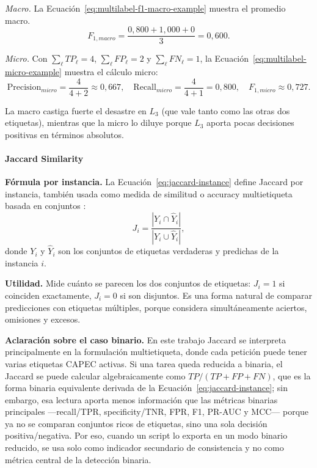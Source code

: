 \documentclass[12pt,oneside]{report}
\begin{document}
\emph{Macro.} La Ecuación~\eqref{eq:multilabel-f1-macro-example} muestra el promedio macro.
\begin{equation}
\label{eq:multilabel-f1-macro-example}
F_{1,macro}=\frac{0{,}800+1{,}000+0}{3}=0{,}600.
\end{equation}

\emph{Micro.} Con $\sum_\ell TP_\ell=4$, $\sum_\ell FP_\ell=2$ y
$\sum_\ell FN_\ell=1$, la Ecuación~\eqref{eq:multilabel-micro-example} muestra el cálculo micro:
\begin{equation}
\label{eq:multilabel-micro-example}
\mathrm{Precision}_{micro}=\frac{4}{4+2}\approx 0{,}667,\quad
\mathrm{Recall}_{micro}=\frac{4}{4+1}=0{,}800,\quad
F_{1,micro}\approx 0{,}727.
\end{equation}

La macro castiga fuerte el desastre en $L_3$ (que vale tanto como las
otras dos etiquetas), mientras que la micro lo diluye porque $L_3$
aporta pocas decisiones positivas en términos absolutos.

\paragraph{Jaccard Similarity}

\textbf{Fórmula por instancia.} La Ecuación~\eqref{eq:jaccard-instance} define Jaccard por instancia, también usada como medida de similitud o accuracy multietiqueta basada en conjuntos \cite{tsoumakas_multilabel_overview,read2011}:
\begin{equation}
\label{eq:jaccard-instance}
J_i = \frac{|Y_i \cap \hat{Y}_i|}{|Y_i \cup \hat{Y}_i|},
\end{equation}
donde $Y_i$ y $\hat{Y}_i$ son los conjuntos de etiquetas verdaderas y
predichas de la instancia $i$.

\textbf{Utilidad.} Mide cuánto se parecen los dos conjuntos de
etiquetas: $J_i=1$ si coinciden exactamente, $J_i=0$ si son disjuntos.
Es una forma natural de comparar predicciones con etiquetas múltiples,
porque considera simultáneamente aciertos, omisiones y excesos.

\textbf{Aclaración sobre el caso binario.} En este trabajo Jaccard se
interpreta principalmente en la formulación multietiqueta, donde cada
petición puede tener varias etiquetas CAPEC activas. Si una tarea queda
reducida a binaria, el Jaccard se puede calcular algebraicamente como
$TP/(TP+FP+FN)$, que es la forma binaria equivalente derivada de la Ecuación~\eqref{eq:jaccard-instance}; sin embargo, esa lectura aporta menos información que las
métricas binarias principales —recall/TPR, specificity/TNR, FPR, F1,
PR-AUC y MCC— porque ya no se comparan conjuntos ricos de etiquetas,
sino una sola decisión positiva/negativa. Por eso, cuando un script
lo exporta en un modo binario reducido, se usa solo como indicador
secundario de consistencia y no como métrica central de la detección
binaria.
\end{document}
